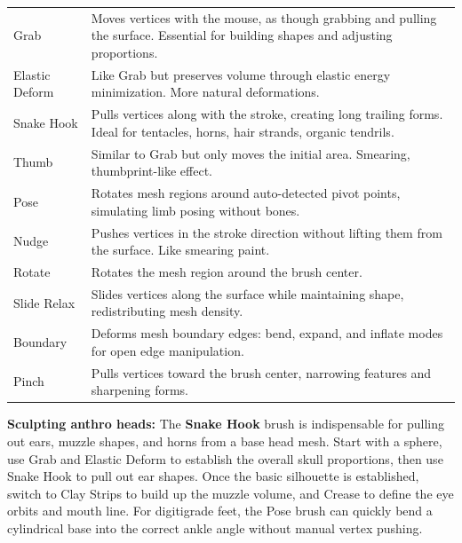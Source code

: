\begin{center}
\begin{tabularx}{\textwidth}{L{3cm}X}
\toprule
{}
 &  \\
\midrule
Grab & Moves vertices with the mouse, as though grabbing and pulling the surface. Essential for building shapes and adjusting proportions. \\
Elastic Deform & Like Grab but preserves volume through elastic energy minimization. More natural deformations. \\
Snake Hook & Pulls vertices along with the stroke, creating long trailing forms. Ideal for tentacles, horns, hair strands, organic tendrils. \\
Thumb & Similar to Grab but only moves the initial area. Smearing, thumbprint-like effect. \\
Pose & Rotates mesh regions around auto-detected pivot points, simulating limb posing without bones. \\
Nudge & Pushes vertices in the stroke direction without lifting them from the surface. Like smearing paint. \\
Rotate & Rotates the mesh region around the brush center. \\
Slide Relax & Slides vertices along the surface while maintaining shape, redistributing mesh density. \\
Boundary & Deforms mesh boundary edges: bend, expand, and inflate modes for open edge manipulation. \\
Pinch & Pulls vertices toward the brush center, narrowing features and sharpening forms. \\
\bottomrule
\end{tabularx}
\end{center}

\begin{furrybox}
\textbf{Sculpting anthro heads:} The \textbf{Snake Hook} brush is indispensable for pulling out ears, muzzle shapes, and horns from a base head mesh. Start with a sphere, use Grab and Elastic Deform to establish the overall skull proportions, then use Snake Hook to pull out ear shapes. Once the basic silhouette is established, switch to Clay Strips to build up the muzzle volume, and Crease to define the eye orbits and mouth line. For digitigrade feet, the Pose brush can quickly bend a cylindrical base into the correct ankle angle without manual vertex pushing.
\end{furrybox}

